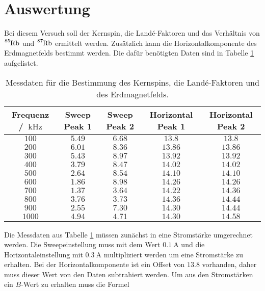 \section{Auswertung}
\label{sec:Auswertung}
Bei diesem Versuch soll der Kernspin, die Landé-Faktoren und das Verhältnis von $\ce{^85Rb}$ und $\ce{^87Rb}$ ermittelt 
werden. Zusätzlich kann die Horizontalkomponente des Erdmagnetfelds bestimmt werden. Die dafür benötigten Daten sind in 
Tabelle \ref{tab:Messdaten_roh} aufgelistet.
\FloatBarrier
\begin{table}
  \centering
  \caption{Messdaten für die Bestimmung des Kernspins, die Landé-Faktoren und des Erdmagnetfelds.}
  \label{tab:Messdaten_roh}
  \begin{tabular}{c c c c c}
    \toprule
    Frequenz / $\SI{}{\kilo\hertz}$&Sweep Peak 1&Sweep Peak 2&Horizontal Peak 1&Horizontal Peak 2\\
    \midrule
    $\num{100}$&$\num{5.49}$&$\num{6.68}$&$\num{13.8}$&$\num{13.8}$\\
    $\num{200}$&$\num{6.01}$&$\num{8.36}$&$\num{13.86}$&$\num{13.86}$\\
    $\num{300}$&$\num{5.43}$&$\num{8.97}$&$\num{13.92}$&$\num{13.92}$\\
    $\num{400}$&$\num{3.79}$&$\num{8.47}$&$\num{14.02}$&$\num{14.02}$\\
    $\num{500}$&$\num{2.64}$&$\num{8.54}$&$\num{14.10}$&$\num{14.10}$\\
    $\num{600}$&$\num{1.86}$&$\num{8.98}$&$\num{14.26}$&$\num{14.26}$\\
    $\num{700}$&$\num{1.37}$&$\num{3.64}$&$\num{14.22}$&$\num{14.36}$\\
    $\num{800}$&$\num{3.76}$&$\num{3.73}$&$\num{14.36}$&$\num{14.44}$\\
    $\num{900}$&$\num{2.55}$&$\num{7.30}$&$\num{14.30}$&$\num{14.44}$\\
    $\num{1000}$&$\num{4.94}$&$\num{4.71}$&$\num{14.30}$&$\num{14.58}$\\
    \bottomrule
  \end{tabular}
\end{table} 
\FloatBarrier
Die Messdaten aus Tabelle \ref{tab:Messdaten_roh} müssen zunächst in eine Stromstärke umgerechnet werden. Die Sweepeinstellung 
muss mit dem Wert $\SI{0.1}{\ampere}$ und die Horizontaleinstellung mit $\SI{0.3}{\ampere}$ multipliziert werden um eine Stromstärke
zu erhalten. Bei der Horizontalkomponente ist ein Offset von $\num{13.8}$ vorhanden, daher muss dieser Wert von den Daten 
subtrahiert werden. Um aus den Stromstärken ein $B$-Wert zu erhalten muss die Formel 
